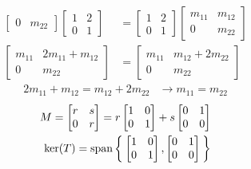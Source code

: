 \documentclass[letterpaper,12pt]{article}
\begin{document}
\begin{enumerate}
\begin{align*}
\begin{bmatrix}
        0 & m_{22}
      \end{bmatrix}
      \begin{bmatrix}
        1 & 2 \\
        0 & 1
      \end{bmatrix}
      &=
      \begin{bmatrix}
        1 & 2 \\
        0 & 1
      \end{bmatrix}
      \begin{bmatrix}
        m_{11} & m_{12} \\
        0 & m_{22}
      \end{bmatrix} \\
      \begin{bmatrix}
        m_{11} & 2m_{11} + m_{12} \\
        0 & m_{22}
      \end{bmatrix}
      &= \begin{bmatrix}
        m_{11} & m_{12} + 2m_{22} \\
        0 & m_{22}
      \end{bmatrix}
    \end{align*}
    \begin{align*}
      2m_{11} + m_{12} = m_{12} + 2m_{22} &\longrightarrow m_{11} = m_{22}
    \end{align*}
    \begin{align*}
      M = \begin{bmatrix}
        r & s \\
        0 & r
      \end{bmatrix} =
      r\begin{bmatrix}
        1 & 0 \\
        0 & 1
      \end{bmatrix} +
      s \begin{bmatrix}
        0 & 1 \\
        0 & 0
      \end{bmatrix} \\
      \text{ker}(T) = \text{span}\Set{
        \begin{bmatrix}
          1 & 0 \\
          0 & 1
        \end{bmatrix},
        \begin{bmatrix}
          0 & 1 \\
          0 & 0
        \end{bmatrix}
      }
    \end{align*}

\end{enumerate}
\end{document}
